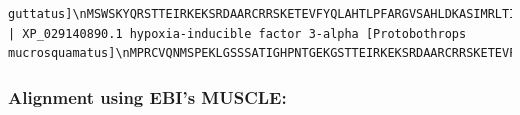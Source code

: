 \documentclass[
  letterpaper,
  DIV=11,
  numbers=noendperiod]{scrartcl}
\begin{document}
\begin{verbatim}
guttatus]\nMSWSKYQRSTTEIRKEKSRDAARCRRSKETEVFYQLAHTLPFARGVSAHLDKASIMRLTISYLRMHKLLNSGEWRDQVKA\nEEQVDSYYLKALDGFLMVLTEEGDMIYLSENVNKHLGLSQLELIGHSVFDFIHPCDQEELQDVLSPRQGFSKKAEVKTER\nNFSLRMKSTLTTRGRTVNLKSATWKVLHCSGHMRSYAPSKPATGKEGEGGFAEPPLRCLVLICEAIPHPANIETPLDSGT\nFLSRHTMDMKFTYCDDRIVEMAGYTSESLLGCSLYEYIHALDSDSVSKSINTLLSKGQAVTGQYRFLARNGGYIWIQTEA\nTVISSSKNSQPESIVCIHFVLSQVEENGLVLSLEQTDRQGEHRRLPPPCLEGLDSDSALEEMDPNGGDTIINLSFELRGP\nKILAFLRPANISEEELQLDPKRFCSPDLQKLLGPIFDPPGTQNSAGGTGRAKPPAPVPKTAPVVKKMSGNHNLSDLPEEL\nIFDMENVQKLFASNKEEQSMETALQDYEGLDLEMLAPYISMDDDFQLSSTDHPPWLTEKRGDPGAGPRPASPPPRPRSRS\nFHGVSPRPPEPAPLPRWGSDSSLSQGRPIETPLANSPCGEGQMVEMVASVKIQSVQDGTGLNGQRSPLGGRKRTREISLD\nEERDLFLETIPPKRAHNHEAEGFLMPSLSLGFLLSVEECLDARSERGCGGTVALGKKLLALEEPMGLLGDMLPFVVDGPA\nLSQLALYDGEEEVSGRGGEHFQLGEELLVELDQAT\n\n>Brown_Spotted_Pit_Viper | XP_029140890.1 hypoxia-inducible factor 3-alpha [Protobothrops mucrosquamatus]\nMPRCVQNMSPEKLGSSSATIGHPNTGEKGSTTEIRKEKSRDAARCRRSKETEVFYQLAHTLPFARGVSAHLDKASIMRLT\nISYLRMHKLLNSGEWRDQVKAEEQVDSYYLKALDGFLMVLTEEGDMIYLSENVNKHLGLSQLELIGHSVFDFIHPCDQEE\nLQDVLSPRQGFSKKGEVKTERNFSLRMKSTLTTRGRTVNLKSATWKVLHCSGHMRCYAPSKPAAGKEGEGGFTEPPLRCL\nVLICEAILHPANIETPLDSGTFLSRHTMDMKFTYCDDRIVEMAGYTSESLLGCSLYEYIHALDSDSVSKSINTLLSKGQA\nVTGQYRFLARNGGYIWIQTEATVISSSKNSQPESIVCMHFVLSQVEENGLVLSLEQTDRQGEHRRLPPPCLEGLDSESAL\nDEMDPNGGDTIINLSFELRGPKILAFLRPANISEEELQLDPKRFCSPDLQKLLGPIFDPPGTQNSAGGAVRAKLPAPIAK\nLAPVVKKASGNHDSAWLPFPLGTLCSPLQDYEGLDLEMLAPYISMDDDFQLSSTDHPPWLAEKRRDPAGAGARPVSPPPR\nPRSRSFHGVSPRPPEAPTLPRWGSDSSLSQGRPVETPLANSPCGEGQMVEMVASVKIQSVQDGAGLNGHRSPLGGKKRAR\nEISLDEERDLFLETSPPKRAHNHEAEGFLMPSLSLGFLLSVEECLDARSERGCGGTVALGKKLLALEEPMGLLGDMLPFV\nVDGPALSQLALYDGEEEVSGRGGEHFQLGEELLVELDQAT
\end{verbatim}

\hypertarget{alignment-using-ebis-muscle}{%
\subsubsection{Alignment using EBI's
MUSCLE:}\label{alignment-using-ebis-muscle}}
\end{document}
